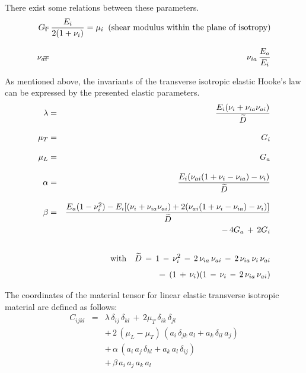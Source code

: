 There exist some relations between these parameters.
\begin{eqnarray}
G_i      & \!\!\!\!\!= & 
\!\!\!\!\!\ttfrac{E_i}{2(1+\nu_i)}=\mu_i\;\;\mbox{(shear modulus within the plane of isotropy)} \\[2.0ex]
\nu_{ai} & \!\!\!\!\!= & \!\!\!\!\!\nu_{ia}\,\ttfrac{E_a}{E_i}
\end{eqnarray}

As mentioned above, the invariants of the transverse isotropic elastic Hooke's law can be expressed by the presented elastic parameters.
\begin{eqnarray*}
\lambda & = &  \frac{\textstyle{\textstyle{E_i(\nu_i+\nu_{ia}\nu_{ai})}}}{\textstyle{\textstyle{{\widetilde D}}}} \\[2.0ex]
\mu_T   & = &  G_i \\[2.0ex]
\mu_L   & = &  G_a \\[2.0ex]
\alpha  & = &  \frac{\textstyle{\textstyle{E_i(\nu_{ai}(1+\nu_i-\nu_{ia})-\nu_i)}}}{\textstyle{\textstyle{{\widetilde D}}}} \\[2.0ex]
\beta   & = &  \frac{\textstyle{\textstyle{E_a(1-\nu_i^2)-E_i[(\nu_i+\nu_{ia}\nu_{ai})+2(\nu_{ai}(1+\nu_i-\nu_{ia})-\nu_i)]}}}{\textstyle{\textstyle{{\widetilde D}}}} \\
        &   & \,-\,4G_a\,+\,2G_i \\[4.0ex]
        &   &  \mbox{with}\quad {\widetilde D}\,=\,
               1\,-\,\nu_i^2\,-\,2\,\nu_{ia}\,\nu_{ai}\,-\,2\,\nu_{ia}\,\nu_{i}\,\nu_{ai} \nonumber \\[1.0ex]
        &   &  \mbox{\hspace*{9.0ex}} =\,
               (1\,+\,\nu_i)(1\,-\,\nu_i\,-\,2\,\nu_{ia}\,\nu_{ai})
\end{eqnarray*}

The coordinates of the material tensor for linear elastic transverse isotropic material are defined as follows:
\begin{eqnarray}
{C}_{ijkl} & = & \lambda\,\delta_{ij}\,\delta_{kl}\,+\,
                        2\mu_T\,\delta_{ik}\,\delta_{jl} \nonumber \\[1.50ex]
                   &   & +\,2\,\left(\mu_L-\mu_T\right)\,
                         \left(a_i\,\delta_{jk}\,a_l+a_k\,\delta_{il}\,a_j\right) \nonumber \\[1.50ex]
                   &   & +\,\alpha\,\left(a_i\,a_j\,\delta_{kl}+a_k\,a_l\,\delta_{ij}\right) \nonumber \\[1.50ex]
                   &   & +\,\beta\,a_i\,a_j\,a_k\,a_l
\end{eqnarray}

\clearpage